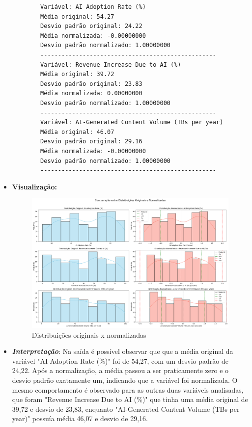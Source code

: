 \documentclass[12pt]{article}
\begin{document}
\begin{itemize}
        \begin{verbatim}
        Variável: AI Adoption Rate (%)
        Média original: 54.27
        Desvio padrão original: 24.22
        Média normalizada: -0.00000000
        Desvio padrão normalizado: 1.00000000
        --------------------------------------------------
        Variável: Revenue Increase Due to AI (%)
        Média original: 39.72
        Desvio padrão original: 23.83
        Média normalizada: 0.00000000
        Desvio padrão normalizado: 1.00000000
        --------------------------------------------------
        Variável: AI-Generated Content Volume (TBs per year)
        Média original: 46.07
        Desvio padrão original: 29.16
        Média normalizada: -0.00000000
        Desvio padrão normalizado: 1.00000000
        --------------------------------------------------
        \end{verbatim}
        
        \item \textbf{Visualização:}
        \begin{figure}[H]
        \centering
        \includegraphics[width=1\textwidth]{normalpadrao.png}
        \caption{Distribuições originais x normalizadas}
        \end{figure}
    \item \textbf{\textit{Interpretação}}: Na saída é possível observar que que a média original da variável "AI Adoption Rate (\%)" foi de 54,27, com um desvio padrão de 24,22. Após a normalização, a média passou a ser praticamente zero e o desvio padrão exatamente um, indicando que a variável foi normalizada. O mesmo comportamento é observado para as outras duas variáveis analisadas, que foram "Revenue Increase Due to AI (\%)" que tinha uma média original de 39,72 e desvio de 23,83, enquanto "AI-Generated Content Volume (TBs per year)" possuía média 46,07 e desvio de 29,16.


\end{itemize}
\end{document}
